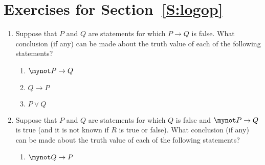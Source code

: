\section*{Exercises for Section~\ref{S:logop}}
\begin{enumerate}
\xitem \label{exer:sec22-1}%
Suppose that Daisy says, ``If it does not rain, then I will play golf.''  Later in the day you come to know that it did rain but Daisy still played golf.  Was Daisy's statement true or false?  Support your conclusion. 

\xitem\label{exer:sec22-2}%
Suppose that  $P$  and  $Q$  are statements for which  $P \to Q$ is true and  for which 
$\mynot Q$ is true.  What conclusion (if any) can be made about the truth value of each of the following statements?
\begin{multicols}{3}
\begin{enumerate}
    \item $P$
    \item $P \wedge Q$
    \item $P \vee Q$
\end{enumerate}
\end{multicols}

\item \label{exer:sec22-3}%
Suppose that  $P$  and  $Q$  are statements for which  $P \to Q$ is false. 
  What conclusion (if any) can be made about the truth value of each of the following statements?

\begin{multicols}{3}
\begin{enumerate}
    \item $\mynot  P \to Q$
    \item $Q \to P$
    \item $P \vee Q$
\end{enumerate}
\end{multicols}


\item \label{exer:statements4}%
Suppose that $P$ and $Q$ are statements for which $Q$ is false and $\mynot P \to Q$ is true (and it is not known if $R$ is true or false).  What conclusion (if any) can be made about the truth value of each of the following statements? 

\begin{multicols}{2}
\begin{enumerate}
\item $\mynot Q \to P$


\end{enumerate}
\end{multicols}
\end{enumerate}
